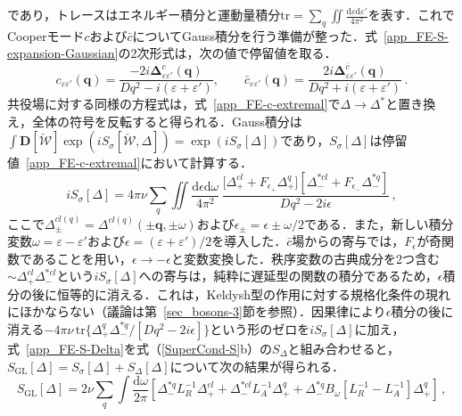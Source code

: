 \documentclass[a4paper,11pt]{ltjsarticle}
\def\tr{\mathrm{tr}}
\def\d{\mathrm{d}}
\def\D{\mathbf{D}}
\begin{document}
であり，トレースはエネルギー積分と運動量積分$\tr =
\sum_{q}\iint\frac{\d\varepsilon\d\varepsilon'}{4\pi^2}$を表す．これでCooperモード$c$および$\bar c$についてGauss積分を行う準備が整った．式~\eqref{app_FE-S-expansion-Gaussian}の2次形式は，次の値で停留値を取る．
\begin{equation}\label{app_FE-c-extremal}
c_{\varepsilon\varepsilon'}(\mathbf{q})=
\frac{-2i\mathbf{\Delta}^{c}_{\varepsilon\varepsilon'}(\mathbf{q})}
{Dq^{2}-i(\varepsilon+\varepsilon')},\qquad
\bar{c}_{\varepsilon\varepsilon'}(\mathbf{q})=
\frac{2i\mathbf{\Delta}^{\bar{c}}_{\varepsilon\varepsilon'}(\mathbf{q})}
{Dq^{2}+i(\varepsilon+\varepsilon')}\,.
\end{equation}
共役場に対する同様の方程式は，式~\eqref{app_FE-c-extremal}で$\Delta\to\Delta^{*}$と置き換え，全体の符号を反転すると得られる．Gauss積分は$\int\D[\check{\mathcal{W}}]\exp(iS_{\sigma}[\check{\mathcal{W}},\Delta])=
\exp(iS_{\sigma}[\Delta])$であり，$S_{\sigma}[\Delta]$は停留値~\eqref{app_FE-c-extremal}において計算する．
\begin{equation}\label{app_FE-S-Delta}
iS_{\sigma}[\Delta]=4\pi\nu\sum_{q}\iint\frac{\d\epsilon\d\omega}{4\pi^2}\,
\frac{\big[\Delta^{cl}_{+}+ F_{\epsilon_{+}}\Delta^{q}_{+}\big]
[\Delta^{*cl}_{-}+
F_{\epsilon_{-}}\Delta^{*q}_{-}]}{Dq^{2}-2i\epsilon}\,,
\end{equation}
ここで$\Delta^{cl(q)}_{\pm}=\Delta^{cl(q)}(\pm\mathbf{q},\pm\omega)$および$\epsilon_{\pm}=\epsilon\pm\omega/2$である．また，新しい積分変数$\omega=\varepsilon-\varepsilon'$および$\epsilon=(\varepsilon+\varepsilon')/2$を導入した．$\bar c$場からの寄与では，$F_\epsilon$が奇関数であることを用い，$\epsilon\to
-\epsilon$と変数変換した．秩序変数の古典成分を2つ含む$\sim\Delta^{cl}_{+}\Delta^{*cl}_{-}$という$iS_{\sigma}[\Delta]$への寄与は，純粋に遅延型の関数の積分であるため，$\epsilon$積分の後に恒等的に消える．これは，Keldysh型の作用に対する規格化条件の現れにほかならない（議論は第~\ref{sec_bosons-3}節を参照）．因果律により$\epsilon$積分の後に消える$-4\pi\nu\,\tr\big\{\Delta^{q}_{+}\Delta^{*q}_{-}/[Dq^{2}-2i\epsilon]\big\}$という形のゼロを$iS_{\sigma}[\Delta]$に加え，式~\eqref{app_FE-S-Delta}を式（\ref{SuperCond-S}b）の$S_{\Delta}$と組み合わせると，$S_{\mathrm{GL}}[\Delta]=S_{\sigma}[\Delta]+S_{\Delta}[\Delta]$について次の結果が得られる．
\begin{equation}\label{app_FE-S-GL}
S_{\mathrm{GL}}[\Delta]=2\nu\sum_{q}\int\frac{\d\omega}{2\pi}
\left[\Delta^{*q}_{-}L^{-1}_{R}\Delta^{cl}_{+}+
\Delta^{*cl}_{-}L^{-1}_{A}\Delta^{q}_{+}
+\Delta^{*q}_{-}B_{\omega}[L^{-1}_{R}-L^{-1}_{A}]\Delta^{q}_{+}\right]\,,
\end{equation}
\end{document}

